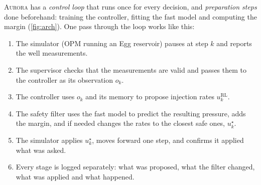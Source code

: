 \documentclass[11pt,letterpaper]{article}
\newcommand{\aur}{\textsc{Aurora}}
\begin{document}
\aur{} has a \emph{control loop} that runs once for every decision, and \emph{preparation
steps} done beforehand: training the controller, fitting the fast model and computing the
margin (\cref{fig:arch}). One pass through the loop works like this:
\begin{enumerate}
\item The simulator (OPM running an Egg reservoir) pauses at step $k$ and reports the well measurements.
\item The supervisor checks that the measurements are valid and passes them to the controller as its observation $o_k$.
\item The controller uses $o_k$ and its memory to propose injection rates $u^{\mathrm{RL}}_k$.
\item The safety filter uses the fast model to predict the resulting pressure, adds the margin, and if needed changes the rates to the closest safe ones, $u^\star_k$.
\item The simulator applies $u^\star_k$, moves forward one step, and confirms it applied what was asked.
\item Every stage is logged separately: what was proposed, what the filter changed, what was applied and what happened.
\end{enumerate}
\end{document}

